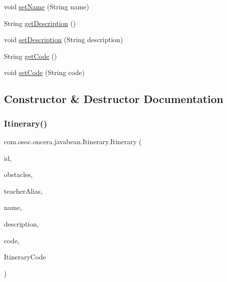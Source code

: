 \begin{DoxyCompactItemize}
\item 
void \mbox{\hyperlink{classcom_1_1osoc_1_1oncera_1_1javabean_1_1_itinerary_abc5cc7036e4d8dc08814139d56926925}{set\+Name}} (String name)
\item 
String \mbox{\hyperlink{classcom_1_1osoc_1_1oncera_1_1javabean_1_1_itinerary_a33b92ae689df9201350059033020692b}{get\+Description}} ()
\item 
void \mbox{\hyperlink{classcom_1_1osoc_1_1oncera_1_1javabean_1_1_itinerary_a871ebd171590d0c05e1988eb3e0f54b1}{set\+Description}} (String description)
\item 
String \mbox{\hyperlink{classcom_1_1osoc_1_1oncera_1_1javabean_1_1_itinerary_a9812db76ddbe4a6ff8b84b27f1c4324c}{get\+Code}} ()
\item 
void \mbox{\hyperlink{classcom_1_1osoc_1_1oncera_1_1javabean_1_1_itinerary_a84fc8654e0259bdde9ca23b854a5c2cc}{set\+Code}} (String code)
\end{DoxyCompactItemize}


\subsection{Constructor \& Destructor Documentation}
\mbox{\label{classcom_1_1osoc_1_1oncera_1_1javabean_1_1_itinerary_a37a7c3895c1735d1cd951b97c1c88a7f}} 
\subsubsection{\texorpdfstring{Itinerary()}{Itinerary()}\hspace{0.1cm}{\footnotesize\ttfamily [1/2]}}
{\footnotesize\ttfamily com.\+osoc.\+oncera.\+javabean.\+Itinerary.\+Itinerary (\begin{DoxyParamCaption}\item[{String}]{id,  }\item[{Array\+List$<$ \mbox{\hyperlink{classcom_1_1osoc_1_1oncera_1_1javabean_1_1_obstacles}{Obstacles}} $>$}]{obstacles,  }\item[{String}]{teacher\+Alias,  }\item[{String}]{name,  }\item[{String}]{description,  }\item[{String}]{code,  }\item[{String}]{Itinerary\+Code }\end{DoxyParamCaption})}

